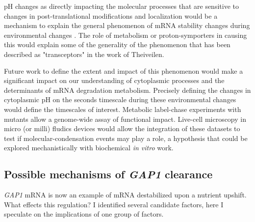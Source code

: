 pH changes as directly impacting the molecular processes that are
sensitive to changes in post-translational modifications and
localization would be a mechanism to explain the general phenomenon
of mRNA stability changes during environmental changes
\parencite{perez2013eukaryotic, canadell2015impact}.
The role of metabolism or proton-symporters in causing this would
explain some of the generality of the phenomenon that has been
described as "transceptors" in the work of Theiveilen.

Future work to define the extent and impact of this phenomenon
would make a significant impact on our understanding of cytoplasmic
processes and the determinants of mRNA degradation metabolism. 
Precisely defining the changes in cytoplasmic pH
on the seconds timescale during these environmental changes would 
define the timescales of interest. Metabolic label-chase experiments
with mutants allow a genome-wide assay of functional impact.
Live-cell microscopy in micro (or milli) fludics devices would
allow the integration of these datasets to test if
molecular-condensation events may play a role, a hypothesis
that could be explored mechanistically with biochemical 
\textit{in vitro} work.

\subsection{Possible mechanisms of \textit{GAP1} clearance}

\textit{GAP1} mRNA is now an example of mRNA destabilized upon
a nutrient upshift. What effects this regulation?
I identified several candidate factors, here I speculate on the
implications of one group of factors.


